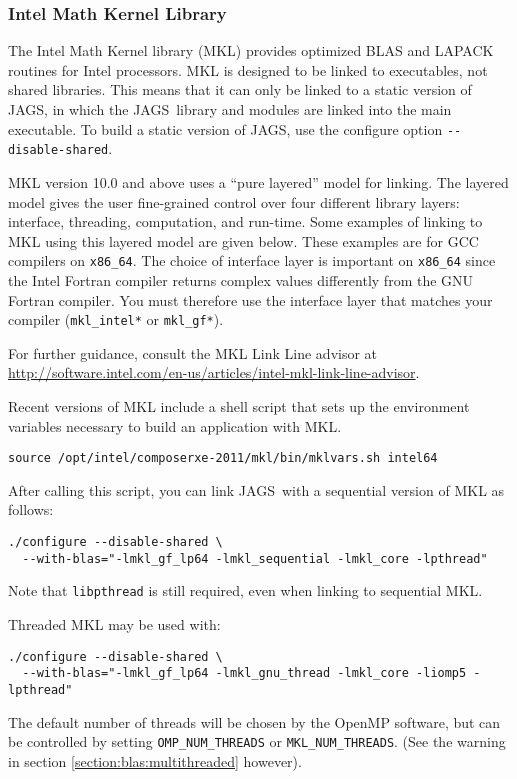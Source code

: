 \documentclass[11pt, a4paper, titlepage]{article}
\newcommand{\JAGS}{\textsf{JAGS}}
\begin{document}
\subsubsection{Intel Math Kernel Library}

The Intel Math Kernel library (MKL) provides optimized BLAS and LAPACK
routines for Intel processors.  MKL is designed to be linked to
executables, not shared libraries. This means that it can only be
linked to a static version of \JAGS, in which the \JAGS\ library and
modules are linked into the main executable. To build a static version
of \JAGS, use the configure option \verb+--disable-shared+.

MKL version 10.0 and above uses a ``pure layered'' model for linking.
The layered model gives the user fine-grained control over four
different library layers: interface, threading, computation, and
run-time. Some examples of linking to MKL using this layered model are
given below. These examples are for GCC compilers on
\verb+x86_64+. The choice of interface layer is important on
\verb+x86_64+ since the Intel Fortran compiler returns complex values
differently from the GNU Fortran compiler. You must therefore use the
interface layer that matches your compiler (\verb+mkl_intel*+ or
\verb+mkl_gf*+).

For further guidance, consult the MKL Link Line advisor at
\url{http://software.intel.com/en-us/articles/intel-mkl-link-line-advisor}.

Recent versions of MKL include a shell script that sets up the
environment variables necessary to build an application with MKL.
\begin{verbatim}
source /opt/intel/composerxe-2011/mkl/bin/mklvars.sh intel64
\end{verbatim}

After calling this script, you can link \JAGS\ with a sequential
version of MKL as follows:
\begin{verbatim}
./configure --disable-shared \
  --with-blas="-lmkl_gf_lp64 -lmkl_sequential -lmkl_core -lpthread"
\end{verbatim}
Note that \verb+libpthread+ is still required, even when linking
to sequential MKL.

Threaded MKL may be used with:
\begin{verbatim}
./configure --disable-shared \
  --with-blas="-lmkl_gf_lp64 -lmkl_gnu_thread -lmkl_core -liomp5 -lpthread"
\end{verbatim}
The default number of threads will be chosen by the OpenMP software,
but can be controlled by setting \verb+OMP_NUM_THREADS+ or
\verb+MKL_NUM_THREADS+.  (See the warning in section
\ref{section:blas:multithreaded} however).
\end{document}
